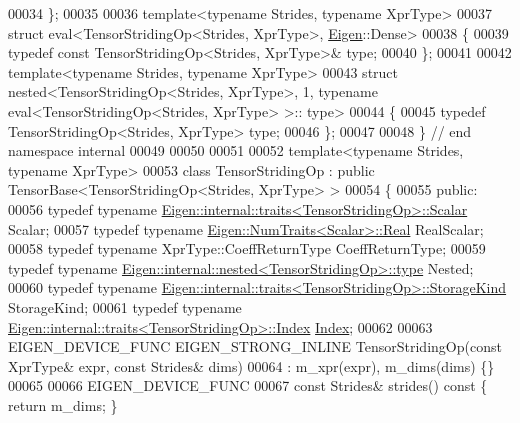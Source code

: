 \begin{DoxyCode}
00034 \};
00035 
00036 \textcolor{keyword}{template}<\textcolor{keyword}{typename} Str\textcolor{keywordtype}{id}es, \textcolor{keyword}{typename} XprType>
00037 \textcolor{keyword}{struct }eval<TensorStridingOp<Strides, XprType>, \hyperlink{namespace_eigen}{Eigen}::Dense>
00038 \{
00039   \textcolor{keyword}{typedef} \textcolor{keyword}{const} TensorStridingOp<Strides, XprType>& type;
00040 \};
00041 
00042 \textcolor{keyword}{template}<\textcolor{keyword}{typename} Str\textcolor{keywordtype}{id}es, \textcolor{keyword}{typename} XprType>
00043 \textcolor{keyword}{struct }nested<TensorStridingOp<Strides, XprType>, 1, typename eval<TensorStridingOp<Strides, XprType> >::
      type>
00044 \{
00045   \textcolor{keyword}{typedef} TensorStridingOp<Strides, XprType> type;
00046 \};
00047 
00048 \}  \textcolor{comment}{// end namespace internal}
00049 
00050 
00051 
00052 \textcolor{keyword}{template}<\textcolor{keyword}{typename} Str\textcolor{keywordtype}{id}es, \textcolor{keyword}{typename} XprType>
00053 \textcolor{keyword}{class }TensorStridingOp : \textcolor{keyword}{public} TensorBase<TensorStridingOp<Strides, XprType> >
00054 \{
00055   \textcolor{keyword}{public}:
00056   \textcolor{keyword}{typedef} \textcolor{keyword}{typename} \hyperlink{struct_eigen_1_1internal_1_1traits}{Eigen::internal::traits<TensorStridingOp>::Scalar}
       Scalar;
00057   \textcolor{keyword}{typedef} \textcolor{keyword}{typename} \hyperlink{group___sparse_core___module}{Eigen::NumTraits<Scalar>::Real} RealScalar;
00058   \textcolor{keyword}{typedef} \textcolor{keyword}{typename} XprType::CoeffReturnType CoeffReturnType;
00059   \textcolor{keyword}{typedef} \textcolor{keyword}{typename} \hyperlink{class_eigen_1_1internal_1_1_tensor_lazy_evaluator_writable}{Eigen::internal::nested<TensorStridingOp>::type}
       Nested;
00060   \textcolor{keyword}{typedef} \textcolor{keyword}{typename} \hyperlink{struct_eigen_1_1internal_1_1traits}{Eigen::internal::traits<TensorStridingOp>::StorageKind}
       StorageKind;
00061   \textcolor{keyword}{typedef} \textcolor{keyword}{typename} \hyperlink{struct_eigen_1_1internal_1_1traits}{Eigen::internal::traits<TensorStridingOp>::Index}
       \hyperlink{namespace_eigen_a62e77e0933482dafde8fe197d9a2cfde}{Index};
00062 
00063   EIGEN\_DEVICE\_FUNC EIGEN\_STRONG\_INLINE TensorStridingOp(\textcolor{keyword}{const} XprType& expr, \textcolor{keyword}{const} Strides& dims)
00064       : m\_xpr(expr), m\_dims(dims) \{\}
00065 
00066     EIGEN\_DEVICE\_FUNC
00067     \textcolor{keyword}{const} Strides& strides()\textcolor{keyword}{ const }\{ \textcolor{keywordflow}{return} m\_dims; \}

\end{DoxyCode}
